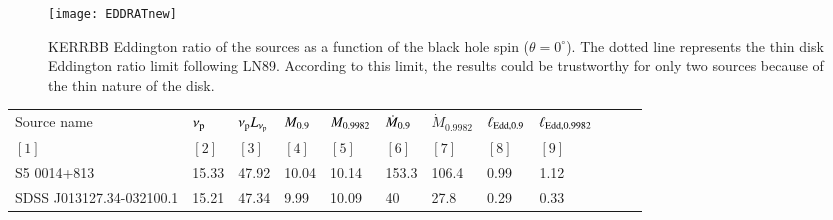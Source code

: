 \documentclass{aa}
\begin{document}
\begin{figure} 
\centering
\texttt{[image: EDDRATnew]}  
\caption{KERRBB Eddington ratio of the sources as a function of the black hole spin ($\theta = 0^{\circ}$). The dotted line represents the thin disk Eddington ratio limit following LN89. According to this limit, the results could be trustworthy for only two sources because of the thin nature of the disk.
}
\label{fig:eddratio}  
\end{figure}

\begin{table*} 
\centering
\footnotesize
\begin{tabular}{llllllllllll}
\hline
Source name & $\nu_{\rm p}$ & \hspace{5mm} $\nu_{\rm p} L_{\nu_{\rm p}}$ & \hspace{5mm} $M_{\rm 0.9}$ & \hspace{5mm} $M_{\rm 0.9982}$ & \hspace{5mm} $\dot{M}_{\rm 0.9}$ & \hspace{5mm} $\dot{M}_{0.9982}$ & \hspace{5mm} $\ell_{\rm Edd, 0.9}$ & \hspace{5mm} $\ell_{\rm Edd, 0.9982}$\\ 
$[1]$ & $[2]$ & \hspace{5mm} $[3]$ & \hspace{5mm} $[4]$ & \hspace{5mm} $[5]$ & \hspace{5mm} $[6]$ & \hspace{5mm} $[7]$ & \hspace{5mm} $[8]$ & \hspace{5mm} $[9]$\\
\hline 
S5 0014+813 & 15.33	& \hspace{5mm} 47.92 & \hspace{5mm} 10.04 & \hspace{5mm} 10.14 & \hspace{5mm} 153.3 & \hspace{5mm} 106.4 & \hspace{5mm} 0.99 & \hspace{5mm} 1.12 \\

SDSS J013127.34-032100.1 & 15.21 & \hspace{5mm} 47.34 & \hspace{5mm} 9.99 & \hspace{5mm} 10.09 & \hspace{5mm} 40 & \hspace{5mm} 27.8 & \hspace{5mm} 0.29 & \hspace{5mm} 0.33 \\


\end{tabular}
\end{table*}
\end{document}
